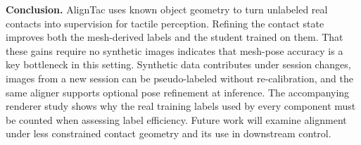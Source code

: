 \noindent\textbf{Conclusion.} AlignTac uses known object geometry to turn unlabeled real contacts into supervision for tactile perception. Refining the contact state improves both the mesh-derived labels and the student trained on them. That these gains require no synthetic images indicates that mesh-pose accuracy is a key bottleneck in this setting. Synthetic data contributes under session changes, images from a new session can be pseudo-labeled without re-calibration, and the same aligner supports optional pose refinement at inference. The accompanying renderer study shows why the real training labels used by every component must be counted when assessing label efficiency. Future work will examine alignment under less constrained contact geometry and its use in downstream control.
